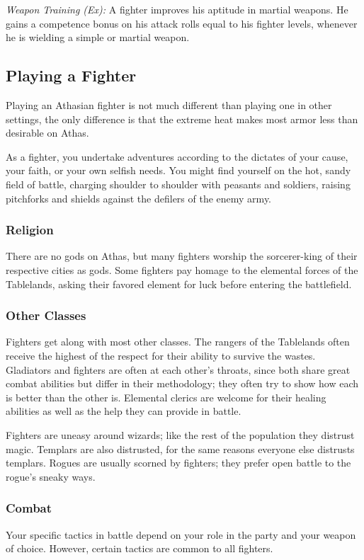 \textit{Weapon Training (Ex):} A fighter improves his aptitude in martial weapons. He gains a competence bonus on his attack rolls equal to \onequarter his fighter levels, whenever he is wielding a simple or martial weapon.


\subsection{Playing a Fighter}
Playing an Athasian fighter is not much different than playing one in other settings, the only difference is that the extreme heat makes most armor less than desirable on Athas.

As a fighter, you undertake adventures according to the dictates of your cause, your faith, or your own selfish needs. You might find yourself on the hot, sandy field of battle, charging shoulder to shoulder with peasants and soldiers, raising pitchforks and shields against the defilers of the enemy army.

\subsubsection{Religion}
There are no gods on Athas, but many fighters worship the sorcerer-king of their respective cities as gods. Some fighters pay homage to the elemental forces of the Tablelands, asking their favored element for luck before entering the battlefield.

\subsubsection{Other Classes}
Fighters get along with most other classes. The rangers of the Tablelands often receive the highest of the respect for their ability to survive the wastes. Gladiators and fighters are often at each other's throats, since both share great combat abilities but differ in their methodology; they often try to show how each is better than the other is. Elemental clerics are welcome for their healing abilities as well as the help they can provide in battle.

Fighters are uneasy around wizards; like the rest of the population they distrust magic. Templars are also distrusted, for the same reasons everyone else distrusts templars. Rogues are usually scorned by fighters; they prefer open battle to the rogue's sneaky ways.

\subsubsection{Combat}
Your specific tactics in battle depend on your role in the party and your weapon of choice. However, certain tactics are common to all fighters.

